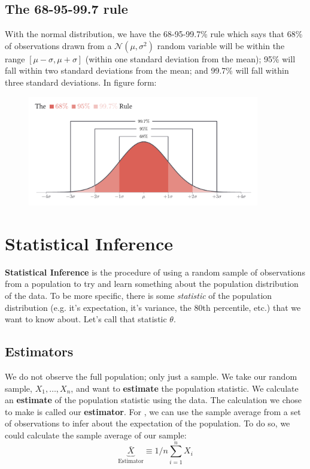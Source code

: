 \documentclass[12pt]{article}
\begin{document}
\subsection*{The 68-95-99.7 rule}

With the normal distribution, we have the 68-95-99.7\% rule which says that 68\% of observations drawn from a $\mathcal{N}(\mu, \sigma^2)$ random variable will be within the range $\left[\mu - \sigma, \mu + \sigma\right]$ (within one standard deviation from the mean); 95\% will fall within two standard deviations from the mean; and 99.7\% will fall within three standard deviations. In figure form:
\begin{figure}[h!]
  \begin{center}
    \includegraphics[width=0.9\textwidth]{figures/68_95_99.pdf}
  \end{center}
\end{figure}







\section{Statistical Inference}

\textbf{Statistical Inference} is the procedure of using a random sample of observations from a population to try and learn something about the population distribution of the data. To be more specific, there is some \emph{statistic} of the population distribution (e.g. it's expectation, it's variance, the 80th percentile, etc.) that we want to know about. Let's call that statistic $\theta$.

\subsection*{Estimators}

We do not observe the full population; only just a sample. We take our random sample, $X_1, \dots, X_n$, and want to \textbf{estimate} the population statistic. We calculate an \textbf{estimate} of the population statistic using the data. The calculation we chose to make is called our \textbf{estimator}. For , we can use the sample average from a set of observations to infer about the expectation of the population. To do so, we could calculate the sample average of our sample:
$$
  \underbrace{\bar{X}}_{\text{Estimator}} \equiv 1/n \sum_{i=1}^n X_i
$$
\end{document}
